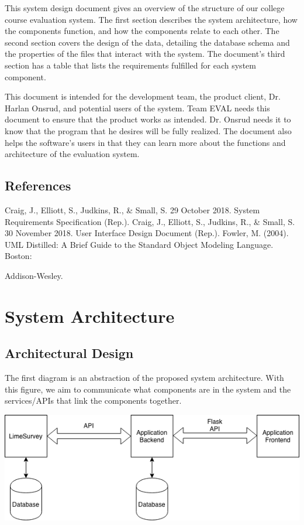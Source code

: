 \documentclass{article}
\begin{document}
This system design document gives an overview of the structure of our college course evaluation system. The first section describes the system architecture, how the components function, and how the components relate to each other. The second section covers the design of the data, detailing the database schema and the properties of the files that interact with the system. The document's third section has a table that lists the requirements fulfilled for each system component.

This document is intended for the development team, the product client, Dr. Harlan Onsrud, and potential users of the system. Team EVAL needs this document to ensure that the product works as intended. Dr. Onsrud needs it to know that the program that he desires will be fully realized. The document also helps the software's users in that they can learn more about the functions and architecture of the evaluation system.

\subsection{References}

Craig, J., Elliott, S., Judkins, R., \& Small, S. 29 October 2018. System Requirements Specification (Rep.).
\vspace{3mm}\newline
Craig, J., Elliott, S., Judkins, R., \& Small, S. 30 November 2018. User Interface Design Document (Rep.).
\vspace{3mm}\newline
Fowler, M. (2004). UML Distilled: A Brief Guide to the Standard Object Modeling Language. Boston:

Addison-Wesley.

\section{System Architecture}
\subsection{Architectural Design}

The first diagram is an abstraction of the proposed system architecture. With this figure, we aim to communicate what components are in the system and the services/APIs that link the components together.
\begin{center}
{\includegraphics[scale=.7]{images/component_diagram.png}} 
\end{center}
\end{document}
